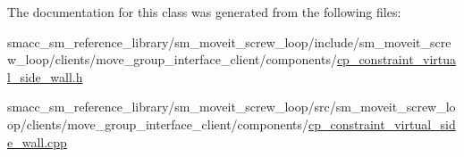 The documentation for this class was generated from the following files\+:\begin{DoxyCompactItemize}
\item 
smacc\+\_\+sm\+\_\+reference\+\_\+library/sm\+\_\+moveit\+\_\+screw\+\_\+loop/include/sm\+\_\+moveit\+\_\+screw\+\_\+loop/clients/move\+\_\+group\+\_\+interface\+\_\+client/components/\hyperlink{sm__moveit__screw__loop_2include_2sm__moveit__screw__loop_2clients_2move__group__interface__clie78a05b8c13c9563cb2f5b80fa12ea9d9}{cp\+\_\+constraint\+\_\+virtual\+\_\+side\+\_\+wall.\+h}\item 
smacc\+\_\+sm\+\_\+reference\+\_\+library/sm\+\_\+moveit\+\_\+screw\+\_\+loop/src/sm\+\_\+moveit\+\_\+screw\+\_\+loop/clients/move\+\_\+group\+\_\+interface\+\_\+client/components/\hyperlink{sm__moveit__screw__loop_2src_2sm__moveit__screw__loop_2clients_2move__group__interface__client_2a3472d57b7c80fd3d682cbf99319b4d5}{cp\+\_\+constraint\+\_\+virtual\+\_\+side\+\_\+wall.\+cpp}\end{DoxyCompactItemize}
